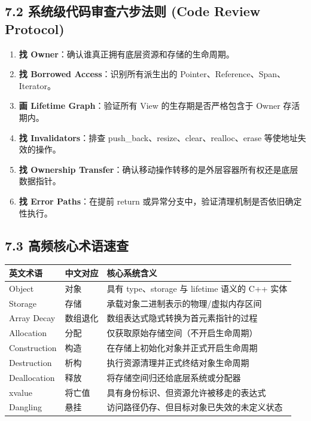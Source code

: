 \documentclass[11pt,a4paper]{article}
\begin{document}
\subsection{7.2 系统级代码审查六步法则 (Code Review Protocol)}
\begin{enumerate}
  \item \textbf{找 Owner}：确认谁真正拥有底层资源和存储的生命周期。
  \item \textbf{找 Borrowed Access}：识别所有派生出的 Pointer、Reference、Span、Iterator。
  \item \textbf{画 Lifetime Graph}：验证所有 View 的生存期是否严格包含于 Owner 存活期内。
  \item \textbf{找 Invalidators}：排查 push\_back、resize、clear、realloc、erase 等使地址失效的操作。
  \item \textbf{找 Ownership Transfer}：确认移动操作转移的是外层容器所有权还是底层数据指针。
  \item \textbf{找 Error Paths}：在提前 return 或异常分支中，验证清理机制是否依旧确定性执行。
\end{enumerate}
\subsection{7.3 高频核心术语速查}
\begin{table}[htbp]
\centering
\small
\begin{tabularx}{\textwidth}{| X | X | X |}
\hline
\rowcolor{codebg}
\textbf{英文术语} & \textbf{中文对应} & \textbf{核心系统含义} \\ \hline
Object & 对象 & 具有 type、storage 与 lifetime 语义的 C++ 实体 \\ \hline
\rowcolor{codebg!50} Storage & 存储 & 承载对象二进制表示的物理/虚拟内存区间 \\ \hline
Array Decay & 数组退化 & 数组表达式隐式转换为首元素指针的过程 \\ \hline
\rowcolor{codebg!50} Allocation & 分配 & 仅获取原始存储空间（不开启生命周期） \\ \hline
Construction & 构造 & 在存储上初始化对象并正式开启生命周期 \\ \hline
\rowcolor{codebg!50} Destruction & 析构 & 执行资源清理并正式终结对象生命周期 \\ \hline
Deallocation & 释放 & 将存储空间归还给底层系统或分配器 \\ \hline
\rowcolor{codebg!50} xvalue & 将亡值 & 具有身份标识、但资源允许被移走的表达式 \\ \hline
Dangling & 悬挂 & 访问路径仍存、但目标对象已失效的未定义状态 \\ \hline
\end{tabularx}
\end{table}
\end{document}
